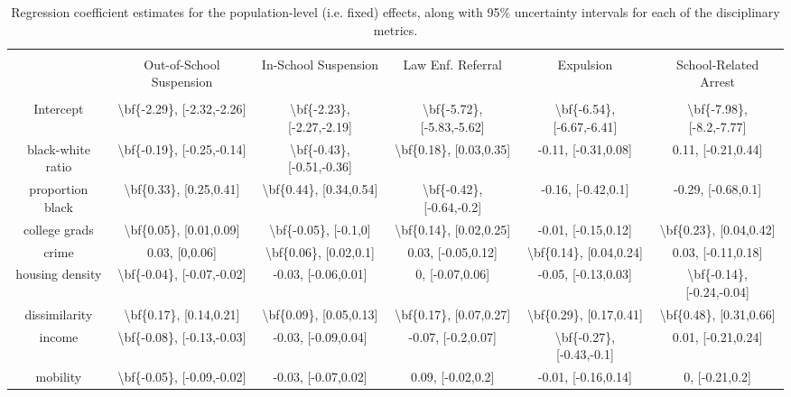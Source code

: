 \documentclass[9pt,twocolumn,twoside,lineno]{pnas-new}
\begin{document}
\begin{table}[!htbp] \centering 
  \caption{Regression coefficient estimates for the population-level (i.e. fixed) effects, along with 95\% uncertainty intervals for each of the disciplinary metrics.} 
  \label{tab:reg-coefs-sex} 
\begin{tabular}{@{\extracolsep{5pt}} cccccc} 
\\[-1.8ex]\hline 
\hline \\[-1.8ex] 
 & Out-of-School Suspension & In-School Suspension & Law Enf. Referral & Expulsion & School-Related Arrest \\ 
\hline \\[-1.8ex] 
Intercept & \textbackslash bf\{-2.29\}, [-2.32,-2.26] & \textbackslash bf\{-2.23\}, [-2.27,-2.19] & \textbackslash bf\{-5.72\}, [-5.83,-5.62] & \textbackslash bf\{-6.54\}, [-6.67,-6.41] & \textbackslash bf\{-7.98\}, [-8.2,-7.77] \\ 
black-white ratio & \textbackslash bf\{-0.19\}, [-0.25,-0.14] & \textbackslash bf\{-0.43\}, [-0.51,-0.36] & \textbackslash bf\{0.18\}, [0.03,0.35] & -0.11, [-0.31,0.08] & 0.11, [-0.21,0.44] \\ 
proportion black & \textbackslash bf\{0.33\}, [0.25,0.41] & \textbackslash bf\{0.44\}, [0.34,0.54] & \textbackslash bf\{-0.42\}, [-0.64,-0.2] & -0.16, [-0.42,0.1] & -0.29, [-0.68,0.1] \\ 
college grads & \textbackslash bf\{0.05\}, [0.01,0.09] & \textbackslash bf\{-0.05\}, [-0.1,0] & \textbackslash bf\{0.14\}, [0.02,0.25] & -0.01, [-0.15,0.12] & \textbackslash bf\{0.23\}, [0.04,0.42] \\ 
crime & 0.03, [0,0.06] & \textbackslash bf\{0.06\}, [0.02,0.1] & 0.03, [-0.05,0.12] & \textbackslash bf\{0.14\}, [0.04,0.24] & 0.03, [-0.11,0.18] \\ 
housing density & \textbackslash bf\{-0.04\}, [-0.07,-0.02] & -0.03, [-0.06,0.01] & 0, [-0.07,0.06] & -0.05, [-0.13,0.03] & \textbackslash bf\{-0.14\}, [-0.24,-0.04] \\ 
dissimilarity & \textbackslash bf\{0.17\}, [0.14,0.21] & \textbackslash bf\{0.09\}, [0.05,0.13] & \textbackslash bf\{0.17\}, [0.07,0.27] & \textbackslash bf\{0.29\}, [0.17,0.41] & \textbackslash bf\{0.48\}, [0.31,0.66] \\ 
income & \textbackslash bf\{-0.08\}, [-0.13,-0.03] & -0.03, [-0.09,0.04] & -0.07, [-0.2,0.07] & \textbackslash bf\{-0.27\}, [-0.43,-0.1] & 0.01, [-0.21,0.24] \\ 
mobility & \textbackslash bf\{-0.05\}, [-0.09,-0.02] & -0.03, [-0.07,0.02] & 0.09, [-0.02,0.2] & -0.01, [-0.16,0.14] & 0, [-0.21,0.2] \\ 

\end{tabular}
\end{table}
\end{document}
